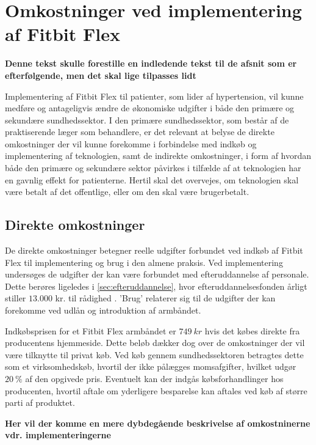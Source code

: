 
\section{Omkostninger ved implementering af Fitbit Flex}

\textbf{Denne tekst skulle forestille en indledende tekst til de afsnit som er efterfølgende, men det skal lige tilpasses lidt} 

Implementering af Fitbit Flex til patienter, som lider af hypertension, vil kunne medføre og antageligvis ændre de økonomiske udgifter i både den primære og sekundære sundhedssektor. I den primære sundhedssektor, som består af de praktiserende læger som behandlere, er det relevant at belyse de direkte omkostninger der vil kunne forekomme i forbindelse med indkøb og implementering af teknologien, samt de indirekte omkostninger, i form af hvordan både den primære og sekundære sektor påvirkes i tilfælde af at teknologien har en gavnlig effekt for patienterne. Hertil skal det overvejes, om teknologien skal være betalt af det offentlige, eller om den skal være brugerbetalt. 

\subsection{Direkte omkostninger}
De direkte omkostninger betegner reelle udgifter forbundet ved indkøb af Fitbit Flex til implementering og brug i den almene praksis.  
Ved implementering undersøges de udgifter der kan være forbundet med efteruddannelse af personale. Dette berøres ligeledes i \autoref{sec:efteruddannelse}, hvor efteruddannelsesfonden årligt stiller $13.000$ kr. til rådighed \citep{vedsted2005}.  
'Brug' relaterer sig til de udgifter der kan forekomme ved udlån og introduktion af armbåndet. 

Indkøbsprisen for et Fitbit Flex armbåndet er $749\ kr$ hvis det købes direkte fra producentens hjemmeside. Dette beløb dækker dog over de omkostninger der vil være tilknytte til privat køb. 
Ved køb gennem sundhedssektoren betragtes dette som et virksomhedskøb, hvortil der ikke pålægges momsafgifter, hvilket udgør $20~\%$ af den opgivede pris. 
Eventuelt kan der indgås købsforhandlinger hos producenten, hvortil aftale om yderligere besparelse kan aftales ved køb af større parti af produktet. 

 \textbf{Her vil der komme en mere dybdegående beskrivelse af omkostninerne vdr. implementeringerne}

